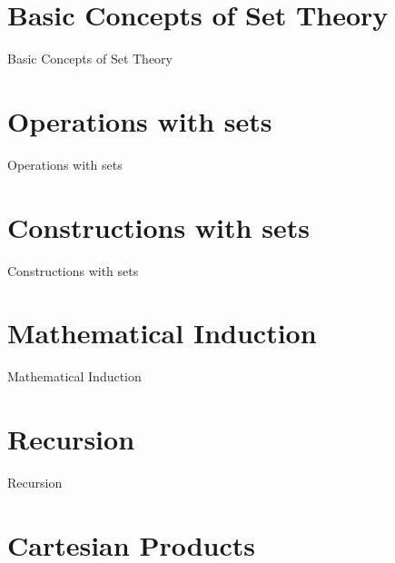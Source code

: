 \section{Basic Concepts of Set Theory}
\label{sec:basic-concepts-of-set-theory}

Basic Concepts of Set Theory

\section{Operations with sets}
\label{sec:operations-with-sets}

Operations with sets

\section{Constructions with sets}
\label{sec:constructions-with-sets}

Constructions with sets

\section{Mathematical Induction}
\label{sec:mathematical-induction}

Mathematical Induction

\section{Recursion}
\label{sec:recursion}

Recursion

\section{Cartesian Products}
\label{sec:cartesian-products}

